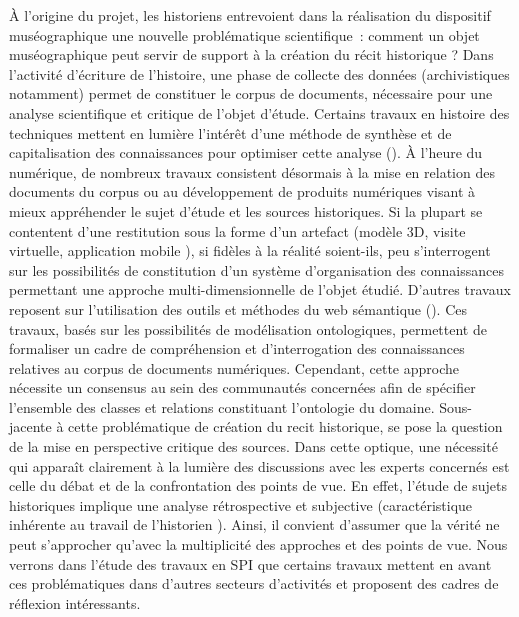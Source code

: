 \documentclass[a4paper,11pt,french]{article}
\begin{document}
À l'origine du projet, les historiens entrevoient dans la réalisation du dispositif muséographique une nouvelle problématique scientifique~: comment un objet muséographique peut servir de support à la création du récit historique ?
Dans l'activité d'écriture de l'histoire, une phase de collecte des données (archivistiques notamment) permet de constituer le corpus de documents, nécessaire pour une analyse scientifique et critique de l'objet d'étude. Certains travaux en histoire des techniques mettent en lumière l'intérêt d'une méthode de synthèse et de capitalisation des connaissances pour optimiser cette analyse ().
À l'heure du numérique, de nombreux travaux consistent désormais à la mise en relation des documents du corpus ou au développement de produits numériques visant à mieux appréhender le sujet d'étude et les sources historiques. Si la plupart se contentent d'une restitution sous la forme d'un artefact (modèle 3D, visite virtuelle, application mobile ), si fidèles à la réalité soient-ils, peu s'interrogent sur les possibilités de constitution d'un système d'organisation des connaissances permettant une approche multi-dimensionnelle de l'objet étudié\cite{Benoit2010}.
D'autres travaux reposent sur l'utilisation des outils et méthodes du web sémantique \cite{Pouyllau2008,Pouyllau2012} (). Ces travaux, basés sur les possibilités de modélisation ontologiques, permettent de formaliser un cadre de compréhension et d'interrogation des connaissances relatives au corpus de documents numériques. Cependant, cette approche nécessite un consensus au sein des communautés concernées afin de spécifier l'ensemble des classes et relations constituant l'ontologie du domaine.
Sous-jacente à cette problématique de création du recit historique, se pose la question de la mise en perspective critique des sources. Dans cette optique, une nécessité qui apparaît clairement à la lumière des discussions avec les experts concernés est celle du débat et de la confrontation des points de vue. En effet, l'étude de sujets historiques implique une analyse rétrospective et subjective (caractéristique inhérente au travail de l'historien ). Ainsi, il convient d'assumer que la vérité ne peut s'approcher qu'avec la multiplicité des approches et des points de vue. Nous verrons dans l'étude des travaux en SPI que certains travaux mettent en avant ces problématiques dans d'autres secteurs d'activités et proposent des cadres de réflexion intéressants.

\end{document}
